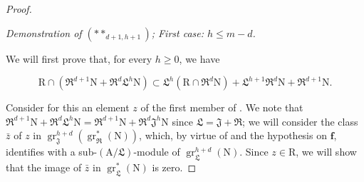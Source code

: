 \begin{proof}
\begin{env}[19.7.1.8]
\label{IV.19.7.1.8}
\emph{Demonstration of $(**_{d+1,h+1})$; First case: $h\leqslant m-d$.}

We will first prove that, for every $h\geqslant 0$, we have
\end{env}
\begin{env}[19.7.1.9]
\label{IV.19.7.1.9}
\[
  \mathrm{R}\cap(\mathfrak{R}^{d+1}\mathrm{N}+\mathfrak{R}^d\mathfrak{L}^h\mathrm{N})\subset\mathfrak{L}^h(\mathrm{R}\cap\mathfrak{R}^d\mathrm{N})+\mathfrak{L}^{h+1}\mathfrak{R}^d\mathrm{N}+\mathfrak{R}^{d+1}\mathrm{N}.
\]
\end{env}

Consider for this an element $z$ of the first member of . We note that $\mathfrak{R}^{d+1}\mathrm{N}+\mathfrak{R}^d\mathfrak{L}^h\mathrm{N}=\mathfrak{R}^{d+1}\mathrm{N}+\mathfrak{R}^d\mathfrak{J}^h\mathrm{N}$ since $\mathfrak{L}=\mathfrak{J}+\mathfrak{R}$; we will consider the class $\bar{z}$ of $z$ in $\operatorname{gr}_\mathfrak{J}^{h+d}(\operatorname{gr}_\mathfrak{R}^*(\mathrm{N}))$, which, by virtue of  and the hypothesis on $\mathbf{f}$, identifies with a sub-$(\mathrm{A}/\mathfrak{L})$-module of $\operatorname{gr}_\mathfrak{L}^{h+d}(\mathrm{N})$. Since $z\in\mathrm{R}$, we will show that the image of $\bar{z}$ in $\operatorname{gr}_\mathfrak{L}^*(\mathrm{N})$ is zero.


\end{proof}
